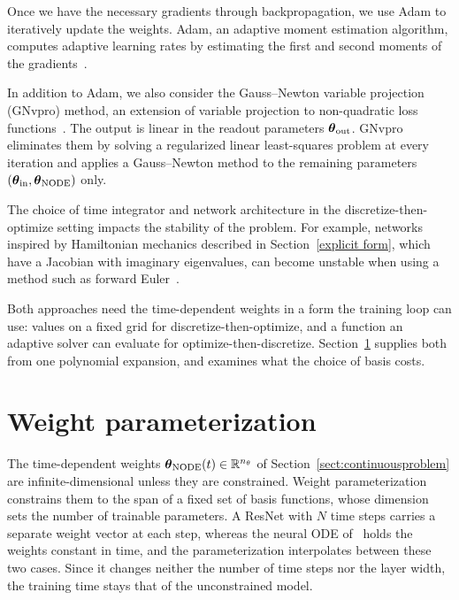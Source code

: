 \documentclass[pdflatex,sn-mathphys-num]{sn-jnl}%
\newcommand{\R}{\mathbb{R}}
\newcommand{\bftheta}{\boldsymbol{\theta}}
\theoremstyle{thmstyleone}%
\theoremstyle{thmstyletwo}%
\theoremstyle{thmstylethree}%
\begin{document}
Once we have the necessary gradients through backpropagation, we use Adam to iteratively update the weights. 
%
Adam, an adaptive moment estimation algorithm, computes adaptive learning rates by estimating the first and second moments of the gradients~\cite{adam}. 
%

In addition to Adam, we also consider the Gauss--Newton variable projection (GNvpro) method, an extension of variable projection to non-quadratic loss functions~\cite{VarPro}. 
%
The output is linear in the readout parameters $\bftheta_{\rm out}$. GNvpro eliminates them by solving a regularized linear least-squares problem at every iteration and applies a Gauss--Newton method to the remaining parameters $(\bftheta_{\rm in},\bftheta_{\rm NODE})$ only. 

The choice of time integrator and network architecture in the discretize-then-optimize setting impacts the stability of the problem.
%
For example, networks inspired by Hamiltonian mechanics described in Section~\ref{explicit form}, which have a Jacobian with imaginary eigenvalues, can become unstable when using a method such as forward Euler~\cite{HaberRuthotto2017}. 

\medskip

\noindent Both approaches need the time-dependent weights in a form the training loop can use: values on a fixed grid for discretize-then-optimize, and a function an adaptive solver can evaluate for optimize-then-discretize. Section~\ref{sect:WeightParam} supplies both from one polynomial expansion, and examines what the choice of basis costs.

\section{Weight parameterization}\label{sect:WeightParam}

The time-dependent weights $\bftheta_{\rm NODE}(t)\in\R^{n_\theta}$ of Section~\ref{sect:continuousproblem} are infinite-dimensional unless they are constrained.
%
Weight parameterization constrains them to the span of a fixed set of basis functions, whose dimension sets the number of trainable parameters.
%
A ResNet with $N$ time steps carries a separate weight vector at each step, whereas the neural ODE of~\cite{ChenEtAl2018} holds the weights constant in time, and the parameterization interpolates between these two cases.
%
Since it changes neither the number of time steps nor the layer width, the training time stays that of the unconstrained model.
\end{document}
